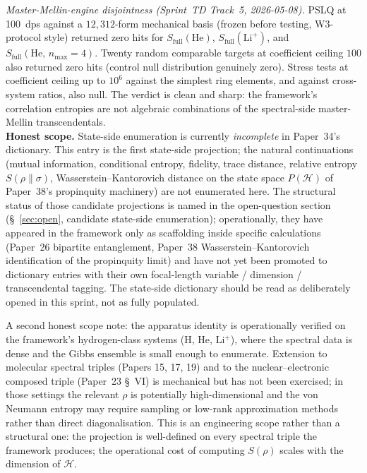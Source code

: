 \documentclass[11pt]{article}
\begin{document}
\textit{Master-Mellin-engine disjointness (Sprint~TD Track~5,
2026-05-08).}  PSLQ at 100~dps against a $12{,}312$-form mechanical
basis (frozen before testing, W3-protocol style) returned zero hits
for $S_\mathrm{full}(\mathrm{He})$, $S_\mathrm{full}(\mathrm{Li}^+)$,
and $S_\mathrm{full}(\mathrm{He},\, n_{\max}{=}4)$.  Twenty random
comparable targets at coefficient ceiling $100$ also returned zero
hits (control null distribution genuinely zero).  Stress tests at
coefficient ceiling up to $10^6$ against the simplest ring elements,
and against cross-system ratios, also null.  The verdict is clean and
sharp: the framework's correlation entropies are not algebraic
combinations of the spectral-side master-Mellin transcendentals.\\
\textbf{Honest scope.}  State-side enumeration is currently
\emph{incomplete} in Paper~34's dictionary.  This entry is the first
state-side projection; the natural continuations
(mutual information, conditional entropy, fidelity, trace distance,
relative entropy $S(\rho \| \sigma)$, Wasserstein--Kantorovich
distance on the state space $P(\mathcal{H})$ of Paper~38's propinquity
machinery) are not enumerated here.  The structural status of those
candidate projections is named in the open-question section
(\S~\ref{sec:open}, candidate state-side enumeration); operationally,
they have appeared in the framework only as scaffolding inside
specific calculations (Paper~26 bipartite entanglement, Paper~38
Wasserstein--Kantorovich identification of the propinquity limit) and
have not yet been promoted to dictionary entries with their own
focal-length variable / dimension / transcendental tagging.  The
state-side dictionary should be read as deliberately opened in this
sprint, not as fully populated.

A second honest scope note: the apparatus identity is operationally
verified on the framework's hydrogen-class systems
(H, He, Li$^+$), where the spectral data is dense and the Gibbs
ensemble is small enough to enumerate.  Extension to molecular
spectral triples (Papers 15, 17, 19) and to the nuclear--electronic
composed triple (Paper~23 \S~VI) is mechanical but has not been
exercised; in those settings the relevant $\rho$ is potentially
high-dimensional and the von Neumann entropy may require sampling
or low-rank approximation methods rather than direct
diagonalisation.  This is an engineering scope rather than a
structural one: the projection is well-defined on every spectral
triple the framework produces; the operational cost of computing
$S(\rho)$ scales with the dimension of $\mathcal{H}$.
\end{document}
